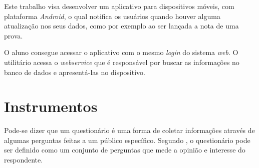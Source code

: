 	\par Este trabalho visa desenvolver um aplicativo para dispositivos móveis, 
com plataforma \textit{Android}, o qual notifica os usuários quando houver alguma
atualização nos seus dados, como por exemplo ao ser lançada a nota de uma prova.
	
	\par O aluno consegue acessar o aplicativo com o mesmo \textit{login} do
sistema \textit{web}. O utilitário acessa o \textit{webservice} que é
responsável por buscar as informações no banco de dados e apresentá-las no
dispositivo.
	
\section{Instrumentos}

	\par Pode-se dizer que um questionário é uma forma de coletar informações
através de algumas perguntas feitas a um público específico. Segundo
, o questionário pode ser definido como um conjunto
de perguntas que mede a opinião e interesse do respondente.

